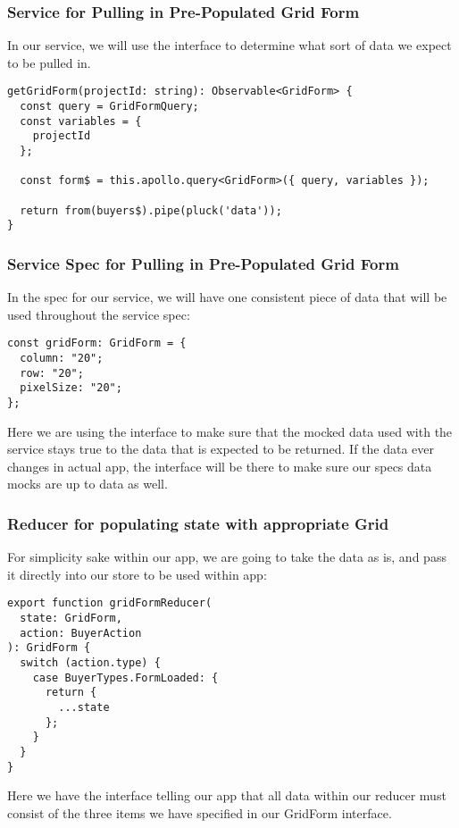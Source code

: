 \subsubsection{ Service for Pulling in Pre-Populated Grid Form }
In our service, we will use the interface to determine what sort of data we
expect to be pulled in.

\begin{lstlisting}
getGridForm(projectId: string): Observable<GridForm> {
  const query = GridFormQuery;
  const variables = {
    projectId
  };

  const form$ = this.apollo.query<GridForm>({ query, variables });

  return from(buyers$).pipe(pluck('data'));
}
\end{lstlisting}

\subsubsection{ Service Spec for Pulling in Pre-Populated Grid Form }
In the spec for our service, we will have one consistent piece of data that will
be used throughout the service spec:
\begin{lstlisting}
const gridForm: GridForm = {
  column: "20";
  row: "20";
  pixelSize: "20";
};
\end{lstlisting}

Here we are using the interface to make sure that the mocked data used with the
service stays true to the data that is expected to be returned. If the data
ever changes in actual app, the interface will be there to make sure our specs
data mocks are up to data as well.

\subsubsection{ Reducer for populating state with appropriate Grid }
For simplicity sake within our app, we are going to take the data as is, and
pass it directly into our store to be used within app:
\begin{lstlisting}
export function gridFormReducer(
  state: GridForm,
  action: BuyerAction
): GridForm {
  switch (action.type) {
    case BuyerTypes.FormLoaded: {
      return {
        ...state
      };
    }
  }
}
\end{lstlisting}

Here we have the interface telling our app that all data within our reducer
must consist of the three items we have specified in our GridForm interface.

